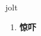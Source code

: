 
\begin{frame}
{\huge jolt}
\begin{center}
\begin{enumerate}\Large
  \item \textbf{惊吓}
\end{enumerate}
\end{center}
\end{frame}
